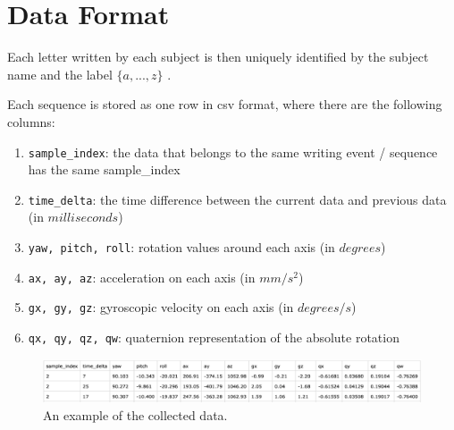 \documentclass{article}
\begin{document}


\section{Data Format} \label{data_format}

Each letter written by each subject is then uniquely identified by the subject name and the label $\{a, ..., z\}$ .

Each sequence is stored as one row in csv format, where there are the following columns:

\begin{enumerate}
    \item \texttt{sample\_index}: the data that belongs to the same writing event / sequence has the same sample\_index
    \item \texttt{time\_delta}: the time difference between the current data and previous data (in \small{$milliseconds$})
    \item \texttt{yaw, pitch, roll}: rotation values around each axis (in \small{$degrees$})
    \item \texttt{ax, ay, az}: acceleration on each axis (in \small{$mm/s^2$})
    \item \texttt{gx, gy, gz}: gyroscopic velocity on each axis (in \small{$degrees/s$})
    \item \texttt{qx, qy, qz, qw}: quaternion representation of the absolute rotation 
\end{enumerate}

\begin{figure}[ht]
    \centering
    \includegraphics[scale=0.35]{data-table-sample.png}
    \caption{An example of the collected data.}
    \label{fig:data_example}
\end{figure}

\end{document}
